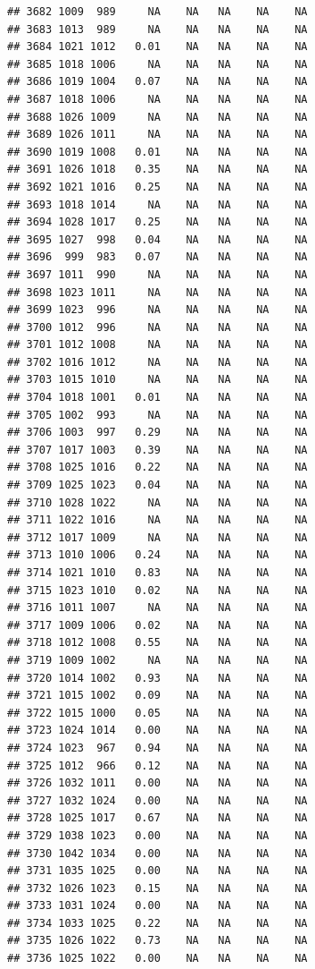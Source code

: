 \documentclass{article}\usepackage{graphicx, color}
\makeatletter
\newenvironment{kframe}{%
 \def\at@end@of@kframe{}%
 \ifinner\ifhmode%
  \def\at@end@of@kframe{\end{minipage}}%
  \begin{minipage}{\columnwidth}%
 \fi\fi%
 \def\FrameCommand##1{\hskip\@totalleftmargin \hskip-\fboxsep
 \colorbox{shadecolor}{##1}\hskip-\fboxsep
     \hskip-\linewidth \hskip-\@totalleftmargin \hskip\columnwidth}%
 \MakeFramed {\advance\hsize-\width
   \@totalleftmargin\z@ \linewidth\hsize
   \@setminipage}}%
 {\par\unskip\endMakeFramed%
 \at@end@of@kframe}
\newenvironment{knitrout}{}{} %
\makeatother
\begin{document}
\begin{knitrout}
\begin{kframe}
\begin{verbatim}
## 3682 1009  989     NA    NA   NA    NA    NA
## 3683 1013  989     NA    NA   NA    NA    NA
## 3684 1021 1012   0.01    NA   NA    NA    NA
## 3685 1018 1006     NA    NA   NA    NA    NA
## 3686 1019 1004   0.07    NA   NA    NA    NA
## 3687 1018 1006     NA    NA   NA    NA    NA
## 3688 1026 1009     NA    NA   NA    NA    NA
## 3689 1026 1011     NA    NA   NA    NA    NA
## 3690 1019 1008   0.01    NA   NA    NA    NA
## 3691 1026 1018   0.35    NA   NA    NA    NA
## 3692 1021 1016   0.25    NA   NA    NA    NA
## 3693 1018 1014     NA    NA   NA    NA    NA
## 3694 1028 1017   0.25    NA   NA    NA    NA
## 3695 1027  998   0.04    NA   NA    NA    NA
## 3696  999  983   0.07    NA   NA    NA    NA
## 3697 1011  990     NA    NA   NA    NA    NA
## 3698 1023 1011     NA    NA   NA    NA    NA
## 3699 1023  996     NA    NA   NA    NA    NA
## 3700 1012  996     NA    NA   NA    NA    NA
## 3701 1012 1008     NA    NA   NA    NA    NA
## 3702 1016 1012     NA    NA   NA    NA    NA
## 3703 1015 1010     NA    NA   NA    NA    NA
## 3704 1018 1001   0.01    NA   NA    NA    NA
## 3705 1002  993     NA    NA   NA    NA    NA
## 3706 1003  997   0.29    NA   NA    NA    NA
## 3707 1017 1003   0.39    NA   NA    NA    NA
## 3708 1025 1016   0.22    NA   NA    NA    NA
## 3709 1025 1023   0.04    NA   NA    NA    NA
## 3710 1028 1022     NA    NA   NA    NA    NA
## 3711 1022 1016     NA    NA   NA    NA    NA
## 3712 1017 1009     NA    NA   NA    NA    NA
## 3713 1010 1006   0.24    NA   NA    NA    NA
## 3714 1021 1010   0.83    NA   NA    NA    NA
## 3715 1023 1010   0.02    NA   NA    NA    NA
## 3716 1011 1007     NA    NA   NA    NA    NA
## 3717 1009 1006   0.02    NA   NA    NA    NA
## 3718 1012 1008   0.55    NA   NA    NA    NA
## 3719 1009 1002     NA    NA   NA    NA    NA
## 3720 1014 1002   0.93    NA   NA    NA    NA
## 3721 1015 1002   0.09    NA   NA    NA    NA
## 3722 1015 1000   0.05    NA   NA    NA    NA
## 3723 1024 1014   0.00    NA   NA    NA    NA
## 3724 1023  967   0.94    NA   NA    NA    NA
## 3725 1012  966   0.12    NA   NA    NA    NA
## 3726 1032 1011   0.00    NA   NA    NA    NA
## 3727 1032 1024   0.00    NA   NA    NA    NA
## 3728 1025 1017   0.67    NA   NA    NA    NA
## 3729 1038 1023   0.00    NA   NA    NA    NA
## 3730 1042 1034   0.00    NA   NA    NA    NA
## 3731 1035 1025   0.00    NA   NA    NA    NA
## 3732 1026 1023   0.15    NA   NA    NA    NA
## 3733 1031 1024   0.00    NA   NA    NA    NA
## 3734 1033 1025   0.22    NA   NA    NA    NA
## 3735 1026 1022   0.73    NA   NA    NA    NA
## 3736 1025 1022   0.00    NA   NA    NA    NA

\end{verbatim}
\end{kframe}
\end{knitrout}
\end{document}
